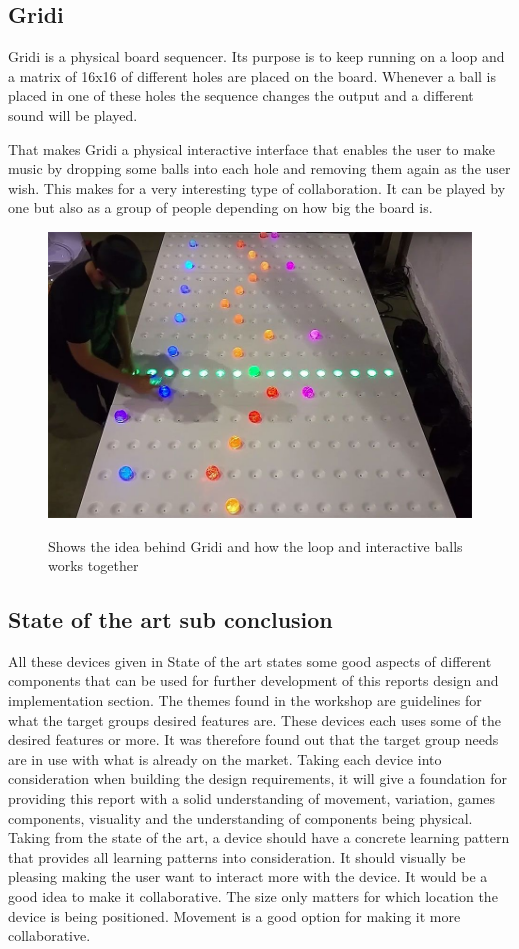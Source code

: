 \subsection{Gridi}
Gridi is a physical board sequencer. Its purpose is to keep running on a loop and a matrix of 16x16 of different holes are placed on the board. Whenever a ball is placed in one of these holes the sequence changes the output and a different sound will be played. 

That makes Gridi a physical interactive interface that enables the user to make music by dropping some balls into each hole and removing them again as the user wish. This makes for a very interesting type of collaboration. It can be played by one but also as a group of people depending on how big the board is. 
\begin{figure}[H]
	\centering
	\includegraphics[width=0.7\linewidth]{figure/Analysis/gridi}
	\label{fig:Gridi}
	\caption{Shows the idea behind Gridi and how the loop and interactive balls works together}
\end{figure}



	 
\subsection{State of the art sub conclusion}
All these devices given in State of the art states some good aspects of different components that can be used for further development of this reports design and implementation section. The themes found in the workshop are guidelines for what the target groups desired features are. These devices each uses some of the desired features or more. It was therefore found out that the target group needs are in use with what is already on the market. Taking each device into consideration when building the design requirements, it will give a foundation for providing this report with a solid understanding of movement, variation, games components, visuality and the understanding of components being physical. Taking from the state of the art, a device should have a concrete learning pattern that provides all learning patterns into consideration. It should visually be pleasing making the user want to interact more with the device. It would be a good idea to make it collaborative. The size only matters for which location the device is being positioned. Movement is a good option for making it more collaborative.






